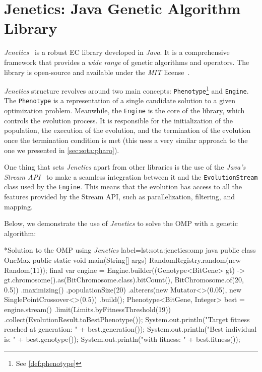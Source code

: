 \section{Jenetics: Java Genetic Algorithm Library}
\label{sec:sota:jenetics}

  \emph{Jenetics}~\autocite{wilhelmstotterJeneticsJavaGenetica} is a robust
  EC library developed in \textit{Java}.
  It is a comprehensive framework that provides a \textit{wide range} of genetic
  algorithms and operators.
  The library is open-source and available under the \textit{MIT} 
  license~\autocite{MITLicense2006}.

  \textit{Jenetics} structure revolves around two main concepts: 
  \texttt{Phenotype}\footnote{See \vref{def:phenotype}} and \texttt{Engine}.
  The \texttt{Phenotype} is a representation of a single candidate solution to
  a given optimization problem.
  Meanwhile, the \texttt{Engine} is the core of the library, which controls the
  evolution process.
  It is responsible for the initialization of the population, the execution of
  the evolution, and the termination of the evolution once the termination
  condition is met (this uses a very similar approach to the one we presented 
  in \vref{sec:sota:pharo}).

  One thing that sets \textit{Jenetics} apart from other libraries is the use 
  of the \textit{Java's Stream API}~\autocite{StreamJavaPlatform} to make a 
  seamless integration between it and the \texttt{EvolutionStream} class used 
  by the \texttt{Engine}.
  This means that the evolution has access to all the features provided by the
  Stream API, such as parallelization, filtering, and mapping.

  Below, we demonstrate the use of \textit{Jenetics} to solve the OMP with a 
  genetic algorithm:

  \begin{code}*{Solution to the OMP using \textit{Jenetics}}{
    label=lst:sota:jenetics:omp
  }{java}
    public class OneMax {
      public static void main(String[] args) {
        RandomRegistry.random(new Random(11));
        final var engine =
            Engine.builder((Genotype<BitGene> gt) ->
                              gt.chromosome().as(BitChromosome.class).bitCount(),
                          BitChromosome.of(20, 0.5))
                  .maximizing()
                  .populationSize(20)
                  .alterers(new Mutator<>(0.05), new SinglePointCrossover<>(0.5))
                  .build();
        Phenotype<BitGene, Integer> best = engine.stream()
                                                .limit(Limits.byFitnessThreshold(19))
                                                .collect(EvolutionResult.toBestPhenotype());
        System.out.println("Target fitness reached at generation: " + best.generation());
        System.out.println("Best individual is: " + best.genotype());
        System.out.println("with fitness: " + best.fitness());
      }
    }
  \end{code}

